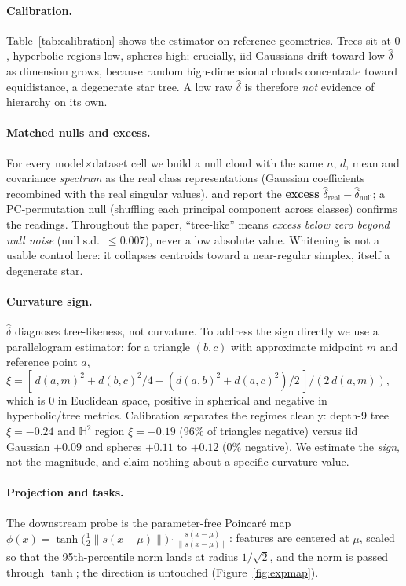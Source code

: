 \documentclass{article} %
\begin{document}
\paragraph{Calibration.} Table~\ref{tab:calibration} shows the estimator on reference geometries. Trees sit at $0$, hyperbolic regions low, spheres high; crucially, iid Gaussians drift toward low $\hat\delta$ as dimension grows, because random high-dimensional clouds concentrate toward equidistance, a degenerate star tree. A low raw $\hat\delta$ is therefore \emph{not} evidence of hierarchy on its own.

\paragraph{Matched nulls and excess.} For every model$\times$dataset cell we build a null cloud with the same $n$, $d$, mean and covariance \emph{spectrum} as the real class representations (Gaussian coefficients recombined with the real singular values), and report the \textbf{excess} $\hat\delta_{\mathrm{real}} - \hat\delta_{\mathrm{null}}$; a PC-permutation null (shuffling each principal component across classes) confirms the readings. Throughout the paper, ``tree-like'' means \emph{excess below zero beyond null noise} (null s.d.\ $\le 0.007$), never a low absolute value. Whitening is not a usable control here: it collapses centroids toward a near-regular simplex, itself a degenerate star.

\paragraph{Curvature sign.} $\hat\delta$ diagnoses tree-likeness, not curvature. To address the sign directly we use a parallelogram estimator: for a triangle $(b,c)$ with approximate midpoint $m$ and reference point $a$, $\xi = [\,d(a,m)^2 + d(b,c)^2/4 - (d(a,b)^2+d(a,c)^2)/2\,]/(2\,d(a,m))$, which is $0$ in Euclidean space, positive in spherical and negative in hyperbolic/tree metrics. Calibration separates the regimes cleanly: depth-9 tree $\xi=-0.24$ and $\mathbb{H}^2$ region $\xi=-0.19$ (96\% of triangles negative) versus iid Gaussian $+0.09$ and spheres $+0.11$ to $+0.12$ (0\% negative). %
We estimate the \emph{sign}, not the magnitude, and claim nothing about a specific curvature value.

\paragraph{Projection and tasks.} The downstream probe is the parameter-free Poincar\'{e} map $\phi(x) = \tanh\!\big(\tfrac12\|s(x-\mu)\|\big)\cdot \frac{s(x-\mu)}{\|s(x-\mu)\|}$: features are centered at $\mu$, scaled so that the 95th-percentile norm lands at radius $1/\sqrt2$, and the norm is passed through $\tanh$; the direction is untouched (Figure~\ref{fig:expmap}).
\end{document}
